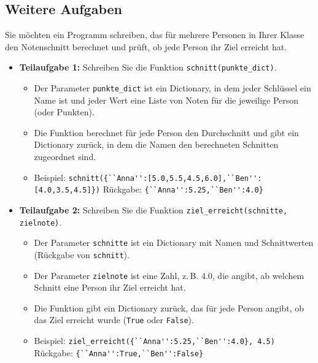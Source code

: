 \subsection{Weitere Aufgaben}
\begin{myexercise}

	Sie möchten ein Programm schreiben, das für mehrere Personen in Ihrer Klasse den Notenschnitt berechnet und prüft, ob jede Person ihr Ziel erreicht hat.

	\begin{itemize}
		\item \textbf{Teilaufgabe 1:} Schreiben Sie die Funktion \lstinline{schnitt(punkte_dict)}.
		      \begin{itemize}
			      \item Der Parameter \lstinline{punkte_dict} ist ein Dictionary, in dem jeder Schlüssel ein Name ist und jeder Wert eine Liste von Noten für die jeweilige Person (oder Punkten).
			      \item Die Funktion berechnet für jede Person den Durchschnitt und gibt ein Dictionary zurück, in dem die Namen den berechneten Schnitten zugeordnet sind.
			      \item Beispiel: \lstinline|schnitt({``Anna'':[5.0,5.5,4.5,6.0],``Ben'':[4.0,3.5,4.5]})|
			            \newline Rückgabe: \lstinline|{``Anna'':5.25,``Ben'':4.0}|
		      \end{itemize}

		\item \textbf{Teilaufgabe 2:} Schreiben Sie die Funktion \lstinline{ziel_erreicht(schnitte, zielnote)}.
		      \begin{itemize}
			      \item Der Parameter \lstinline{schnitte} ist ein Dictionary mit Namen und Schnittwerten (Rückgabe von \lstinline{schnitt}).
			      \item Der Parameter \lstinline{zielnote} ist eine Zahl, z.\,B. 4.0, die angibt, ab welchem Schnitt eine Person ihr Ziel erreicht hat.
			      \item Die Funktion gibt ein Dictionary zurück, das für jede Person angibt, ob das Ziel erreicht wurde (\lstinline{True} oder \lstinline{False}).
			      \item Beispiel: \lstinline|ziel_erreicht({``Anna'':5.25,``Ben'':4.0}, 4.5)|
			            \newline Rückgabe: \lstinline|{``Anna'':True,``Ben'':False}|
		      \end{itemize}
	\end{itemize}


\end{myexercise}
